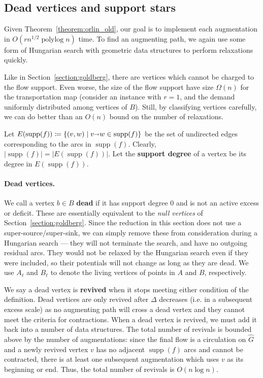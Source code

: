 \documentclass[11pt]{article}
\def\polylog{\mathop{\mathrm{polylog}}}
\def\abs#1{\mathopen| #1 \mathclose|}		%
\def\arcto{\mathord\shortrightarrow}
\def\arc#1#2{#1\arcto#2}
\def\supp{\operatorname{supp}}
\theoremstyle{plain}
\numberwithin{figure}{section}
\def\EMPH#1{\textbf{\boldmath #1}}
\begin{document}
\subsection{Dead vertices and support stars}

Given Theorem~\ref{theorem:orlin_old}, our goal is to implement each
augmentation in $O(rn^{1/2}\polylog n)$ time.
To find an augmenting path, we again use some form of Hungarian search with
geometric data structures to perform relaxations quickly.

Like in Section~\ref{section:goldberg}, there are vertices which cannot be charged
to the flow support.
Even worse, the size of the flow support have size $\Omega(n)$ for the
transportation map (consider an instance with $r=1$, and the demand uniformly
distributed among vertices of $B$).
Still, by classifying vertices carefully, we can do better than an $O(n)$ bound
on the number of relaxations.

Let $E(\supp(f)) \coloneqq \{(v, w) \mid \arc vw \in \supp(f)\}$ be the set
of undirected edges corresponding to the arcs in $\supp(f)$.
Clearly, $\abs{\supp(f)} = \abs{E(\supp(f))}$.
Let the \EMPH{support degree} of a vertex be its degree in $E(\supp(f))$.

\paragraph{Dead vertices.}
We call a vertex $b \in B$ \EMPH{dead} if it has support degree 0 and is not an
active excess or deficit.
These are essentially equivalent to the \emph{null vertices} of
Section~\ref{section:goldberg}.
Since the reduction in this section does not use a super-source/super-sink,
we can simply remove these from consideration during a Hungarian search ---
they will not terminate the search, and have no outgoing residual arcs.
They would not be relaxed by the Hungarian search even if they were included,
so their potentials will not change as long as they are dead.
We use \EMPH{$A_\ell$} and \EMPH{$B_\ell$} to denote the living
vertices of points in $A$ and $B$, respectively.

We say a dead vertex is \EMPH{revived} when it stops meeting either condition
of the definition.
Dead vertices are only revived after $\Delta$ decreases (i.e. in a
subsequent excess scale) as no augmenting path will cross a dead vertex and
they cannot meet the criteria for contractions.
When a dead vertex is revived, we must add it back into a number of data
structures.
The total number of revivals is bounded above by the number of augmentations:
since the final flow is a circulation on $\hat{G}$ and a newly revived vertex
$v$ has no adjacent $\supp(f)$ arcs and cannot be contracted, there is at least
one subsequent augmentation which uses $v$ as its beginning or end.
Thus, the total number of revivals is $O(n\log n)$.
\end{document}
